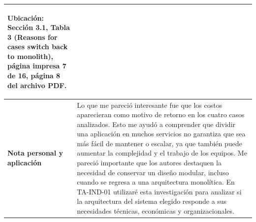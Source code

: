 \documentclass[11pt,a4paper]{article}
\begin{document}
\begin{longtable}{
|>{\raggedright\arraybackslash\bfseries}p{3.4cm}
|>{\raggedright\arraybackslash}p{11.6cm}|
}
\par\smallskip

\textbf{Ubicación:}
Sección 3.1, Tabla 3
(Reasons for cases switch back to monolith),
página impresa 7 de 16,
página 8 del archivo PDF.
\\
\hline


Nota personal y aplicación
&
Lo que me pareció interesante fue que los costos aparecieran como motivo de retorno en los cuatro casos analizados. Esto me ayudó a comprender que dividir una aplicación en muchos servicios no garantiza que sea más fácil de mantener o escalar, ya que también puede aumentar la complejidad y el trabajo de los equipos. Me pareció importante que los autores destaquen la necesidad de conservar un diseño modular, incluso cuando se regresa a una arquitectura monolítica. En TA-IND-01 utilizaré esta investigación para analizar si la arquitectura del sistema elegido responde a sus necesidades técnicas, económicas y organizacionales.
\\
\hline

\end{longtable}


\end{document}
